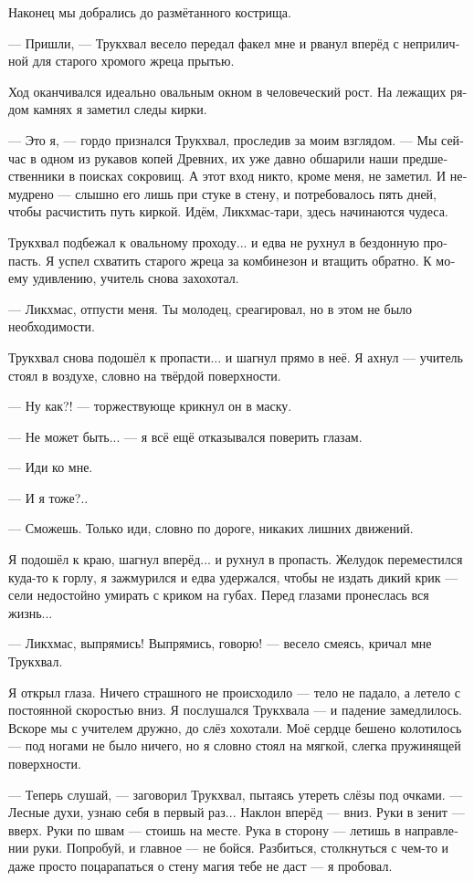 \documentclass[a4paper,12pt,fleqn]{book}\usepackage{polyglossia}\setdefaultlanguage[babelshorthands=true]{russian}\setotherlanguage{english}\defaultfontfeatures{Ligatures=TeX,Mapping=tex-text}\usepackage{xcolor}\newcommand{\ml}[3]{#2}
\begin{document}
{Наконец мы добрались до размётанного кострища.

--- Пришли, --- Трукхвал весело передал факел мне и рванул вперёд с неприличной для старого хромого жреца прытью.

Ход оканчивался идеально овальным окном в человеческий рост.
На лежащих рядом камнях я заметил следы кирки.

--- Это я, --- гордо признался Трукхвал, проследив за моим взглядом.
--- Мы сейчас в одном из рукавов копей Древних, их уже давно обшарили наши предшественники в поисках сокровищ.
А этот вход никто, кроме меня, не заметил.
И немудрено --- слышно его лишь при стуке в стену, и потребовалось пять дней, чтобы расчистить путь киркой.
Идём, Ликхмас-тари, здесь начинаются чудеса.

Трукхвал подбежал к овальному проходу... и едва не рухнул в бездонную пропасть.
Я успел схватить старого жреца за комбинезон и втащить обратно.
К моему удивлению, учитель снова захохотал.

--- Ликхмас, отпусти меня.
Ты молодец, среагировал, но в этом не было необходимости.

Трукхвал снова подошёл к пропасти... и шагнул прямо в неё.
Я ахнул --- учитель стоял в воздухе, словно на твёрдой поверхности.

--- Ну как?! --- торжествующе крикнул он в маску.

--- Не может быть... --- я всё ещё отказывался поверить глазам.

--- Иди ко мне.

--- И я тоже?..

--- Сможешь.
Только иди, словно по дороге, никаких лишних движений.

Я подошёл к краю, шагнул вперёд... и рухнул в пропасть.
Желудок переместился куда-то к горлу, я зажмурился и едва удержался, чтобы не издать дикий крик --- сели недостойно умирать с криком на губах.
Перед глазами пронеслась вся жизнь...

--- Ликхмас, выпрямись!
Выпрямись, говорю! --- весело смеясь, кричал мне Трукхвал.

Я открыл глаза.
Ничего страшного не происходило --- тело не падало, а летело с постоянной скоростью вниз.
Я послушался Трукхвала --- и падение замедлилось.
Вскоре мы с учителем дружно, до слёз хохотали.
Моё сердце бешено колотилось --- под ногами не было ничего, но я словно стоял на мягкой, слегка пружинящей поверхности.

--- Теперь слушай, --- заговорил Трукхвал, пытаясь утереть слёзы под очками.
--- Лесные духи, узнаю себя в первый раз...
Наклон вперёд --- вниз.
Руки в зенит --- вверх.
Руки по швам --- стоишь на месте.
Рука в сторону --- летишь в направлении руки.
Попробуй, и главное --- не бойся.
Разбиться, столкнуться с чем-то и даже просто поцарапаться о стену магия тебе не даст --- я пробовал.

}
\end{document}
